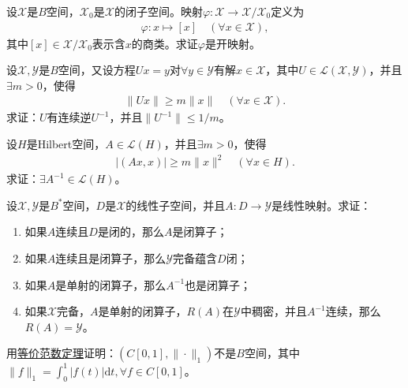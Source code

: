 \documentclass[../../main.tex]{subfiles}%
\begin{document}
\begin{example}
设$\mathscr{X}$是$B$空间，$\mathscr{X}_0$是$\mathscr{X}$的闭子空间。映射$\varphi:\mathscr{X}\to\mathscr{X}/\mathscr{X}_0$定义为
\begin{align*}
\varphi:x\mapsto [x]\quad (\forall x\in\mathscr{X}),
\end{align*}
其中$[x]\in \mathscr{X}/\mathscr{X}_0$表示含$x$的商类。求证$\varphi$是开映射。
\end{example}

\begin{example}
设$\mathscr{X},\mathscr{Y}$是$B$空间，又设方程$Ux=y$对$\forall y\in\mathscr{Y}$有解$x\in\mathscr{X}$，其中$U\in\mathscr{L}(\mathscr{X},\mathscr{Y})$，并且$\exists m>0$，使得
\begin{align*}
\|Ux\|\geqslant m\|x\|\quad (\forall x\in\mathscr{X}).
\end{align*}
求证：$U$有连续逆$U^{-1}$，并且$\|U^{-1}\|\leqslant 1/m$。
\end{example}

\begin{example}
设$H$是Hilbert空间，$A\in\mathscr{L}(H)$，并且$\exists m>0$，使得
\begin{align*}
|(Ax,x)|\geqslant m\|x\|^2\quad (\forall x\in H).
\end{align*}
求证：$\exists A^{-1}\in\mathscr{L}(H)$。
\end{example}

\begin{example}
设$\mathscr{X},\mathscr{Y}$是$B^*$空间，$D$是$\mathscr{X}$的线性子空间，并且$A:D\to\mathscr{Y}$是线性映射。求证：
\begin{enumerate}[(1)]
\item 如果$A$连续且$D$是闭的，那么$A$是闭算子；
\item 如果$A$连续且是闭算子，那么$\mathscr{Y}$完备蕴含$D$闭；
\item 如果$A$是单射的闭算子，那么$A^{-1}$也是闭算子；
\item 如果$\mathscr{X}$完备，$A$是单射的闭算子，$R(A)$在$\mathscr{Y}$中稠密，并且$A^{-1}$连续，那么$R(A)=\mathscr{Y}$。
\end{enumerate}
\end{example}

\begin{example}
用\hyperref[corollary:泛函分析--等价范数定理]{等价范数定理}证明：$(C[0,1],\|\cdot\|_1)$不是$B$空间，其中$\|f\|_1=\int_{0}^{1}|f(t)|\mathrm{d}t,\forall f\in C[0,1]$。
\end{example}
\end{document}
